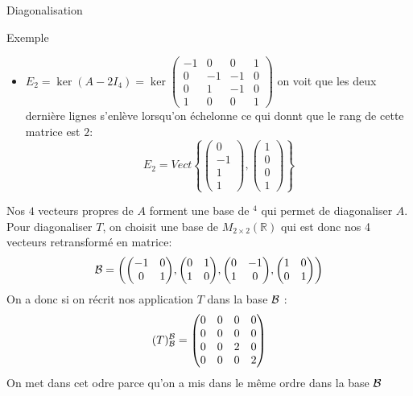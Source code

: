 \begin{parag}{Diagonalisation}
\begin{subparag}{Exemple}
\begin{itemize}
                \item $E_2 = \ker(A - 2I_4) = \ker \begin{pmatrix}
                    -1 & 0 & 0 & 1\\
                    0 & -1 & -1 & 0\\
                    0 & 1 & -1 & 0\\
                    1 &0 & 0 & 1
                \end{pmatrix}$ on voit que les deux dernière lignes s'enlève lorsqu'on échelonne ce qui donnt que le rang de cette matrice est $2$:
                \\
                \[E_2 = Vect \left\{\begin{pmatrix}
                    0\\-1\\1\\1
                \end{pmatrix}, \begin{pmatrix}
                    1 \\0\\0\\1
                \end{pmatrix}\right\}\]
            \end{itemize}
            Nos $4$ vecteurs propres de $A$ forment une base de \R$^4$ qui permet de diagonaliser $A$. Pour diagonaliser $T$, on choisit une base de $M_{2\times 2}(\mathbb{R})$ qui est donc nos 4 vecteurs retransformé en matrice:
            \[\bmath = \left(\begin{pmatrix}
                -1 & 0\\0&1
            \end{pmatrix}, \begin{pmatrix}
                0 & 1\\1 & 0
            \end{pmatrix}, \begin{pmatrix}
                0 & -1 \\ 1 & 0
            \end{pmatrix}, \begin{pmatrix}
                1 & 0 \\ 0 & 1
            \end{pmatrix}\right)\]
            On a donc si on récrit nos application $T$ dans la base $\mathcal{B}$ : 
            \[(T)_{\mathcal{B}}^{\mathcal{B}} = \begin{pmatrix}
                0 & 0 & 0 & 0\\
                0 & 0 & 0 & 0 \\
                0 & 0 & 2 & 0\\
                0 &0 & 0 & 2
            \end{pmatrix}\]
            On met dans cet odre parce qu'on a mis dans le même ordre dans la base $\mathcal{B}$
    \end{subparag}
\end{parag}


